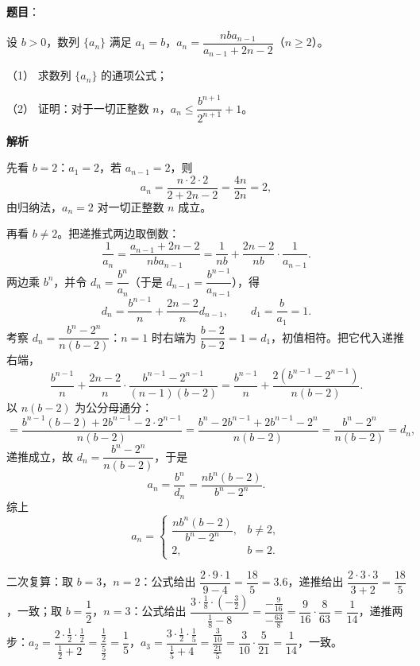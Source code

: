\begin{answer}

\textbf{题目}：

设 $b>0$，数列 $\{a_n\}$ 满足 $a_1=b$，$a_n=\dfrac{nba_{n-1}}{a_{n-1}+2n-2}$（$n\geqslant2$）。

（1） 求数列 $\{a_n\}$ 的通项公式；

（2） 证明：对于一切正整数 $n$，$a_n\leqslant\dfrac{b^{n+1}}{2^{n+1}}+1$。

\textbf{解析}

先看 $b=2$：$a_1=2$，若 $a_{n-1}=2$，则
\nopagebreak[4]
\[a_n=\frac{n\cdot 2\cdot 2}{2+2n-2}=\frac{4n}{2n}=2,\]
由归纳法，$a_n=2$ 对一切正整数 $n$ 成立。

再看 $b\neq 2$。把递推式两边取倒数：
\nopagebreak[4]
\[\frac{1}{a_n}=\frac{a_{n-1}+2n-2}{nba_{n-1}}=\frac{1}{nb}+\frac{2n-2}{nb}\cdot\frac{1}{a_{n-1}}.\]
两边乘 $b^n$，并令 $d_n=\dfrac{b^n}{a_n}$（于是 $d_{n-1}=\dfrac{b^{n-1}}{a_{n-1}}$），得
\nopagebreak[4]
\[d_n=\frac{b^{n-1}}{n}+\frac{2n-2}{n}d_{n-1},\qquad d_1=\frac{b}{a_1}=1.\]
考察 $d_n=\dfrac{b^n-2^n}{n(b-2)}$：$n=1$ 时右端为 $\dfrac{b-2}{b-2}=1=d_1$，初值相符。把它代入递推右端，
\nopagebreak[4]
\[\frac{b^{n-1}}{n}+\frac{2n-2}{n}\cdot\frac{b^{n-1}-2^{n-1}}{(n-1)(b-2)}=\frac{b^{n-1}}{n}+\frac{2\left(b^{n-1}-2^{n-1}\right)}{n(b-2)}.\]
以 $n(b-2)$ 为公分母通分：
\nopagebreak[4]
\[=\frac{b^{n-1}(b-2)+2b^{n-1}-2\cdot 2^{n-1}}{n(b-2)}=\frac{b^n-2b^{n-1}+2b^{n-1}-2^n}{n(b-2)}=\frac{b^n-2^n}{n(b-2)}=d_n,\]
递推成立，故 $d_n=\dfrac{b^n-2^n}{n(b-2)}$，于是
\nopagebreak[4]
\[a_n=\frac{b^n}{d_n}=\frac{nb^n(b-2)}{b^n-2^n}.\]
综上
\nopagebreak[4]
\[a_n=\begin{cases}\dfrac{nb^n(b-2)}{b^n-2^n}, & b\neq 2,\\[2mm] 2, & b=2.\end{cases}\]

二次复算：取 $b=3$，$n=2$：公式给出 $\dfrac{2\cdot9\cdot1}{9-4}=\dfrac{18}{5}=3.6$，递推给出 $\dfrac{2\cdot3\cdot3}{3+2}=\dfrac{18}{5}$，一致；取 $b=\dfrac12$，$n=3$：公式给出 $\dfrac{3\cdot\frac18\cdot\left(-\frac32\right)}{\frac18-8}=\dfrac{-\frac{9}{16}}{-\frac{63}{8}}=\dfrac{9}{16}\cdot\dfrac{8}{63}=\dfrac{1}{14}$，递推两步：$a_2=\dfrac{2\cdot\frac12\cdot\frac12}{\frac12+2}=\dfrac{\frac12}{\frac52}=\dfrac15$，$a_3=\dfrac{3\cdot\frac12\cdot\frac15}{\frac15+4}=\dfrac{\frac{3}{10}}{\frac{21}{5}}=\dfrac{3}{10}\cdot\dfrac{5}{21}=\dfrac{1}{14}$，一致。


\end{answer}
